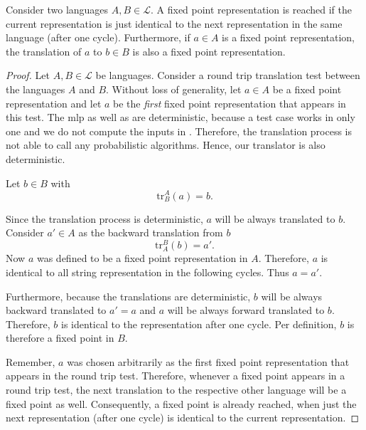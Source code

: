 \begin{theorem}\label{theo:fixpoint}
Consider two languages $A,B \in \mathcal{L}$. A fixed point representation is reached if the current representation is just identical to the next representation in the same language (after one cycle). Furthermore, if $a \in A$ is a fixed point representation, the translation of $a$ to $b \in B$ is also a fixed point representation.
\end{theorem}
\begin{proof}
Let $A, B \in \mathcal{L}$ be languages. Consider a round trip translation test between the languages $A$ and $B$. Without loss of generality, let $a \in A$ be a fixed point representation and let $a$ be the \textit{first} fixed point representation that appears in this test. The \gls{mlp} as well as \Maple{} are deterministic, because a test case works in only one  and we do not compute the inputs in \Maple. Therefore, the translation process is not able to call any probabilistic algorithms. Hence, our translator is also deterministic. 

Let $b \in B$ with
\begin{equation}
\mathrm{tr}^A_B(a) = b.
\end{equation}

Since the translation process is deterministic, $a$ will be always translated to $b$. Consider $a' \in A$ as the backward translation from $b$
\begin{equation}
\mathrm{tr}^B_A(b) = a'.
\end{equation}
Now $a$ was defined to be a fixed point representation in $A$. Therefore, $a$ is identical to all string representation in the following cycles. Thus $a = a'$.

Furthermore, because the translations are deterministic, $b$ will be always backward translated to $a' = a$ and $a$ will be always forward translated to $b$. Therefore, $b$ is identical to the representation after one cycle. Per definition, $b$ is therefore a fixed point in $B$.

Remember, $a$ was chosen arbitrarily as the first fixed point representation that appears in the round trip test. Therefore, whenever a fixed point appears in a round trip test, the next translation to the respective other language will be a fixed point as well. Consequently, a fixed point is already reached, when just the next representation (after one cycle) is identical to the current representation.
\end{proof}

